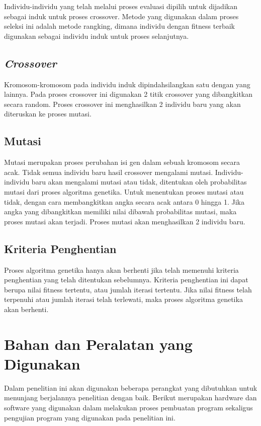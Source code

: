   Individu-individu yang telah melalui proses evaluasi dipilih untuk dijadikan sebagai induk untuk proses crossover.
  Metode yang digunakan dalam proses seleksi ini adalah metode \linebreak rangking, dimana individu dengan fitness terbaik digunakan sebagai individu induk untuk proses selanjutnya.
 
  \subsection{\emph{Crossover}}
  
  Kromosom-kromosom pada individu induk dipindahsilangkan satu dengan yang lainnya. Pada proses crossover ini digunakan 2 titik crossover yang dibangkitkan secara random.
  Proses crossover ini menghasilkan 2 individu baru yang akan diteruskan ke proses mutasi.

  \subsection{Mutasi}
  
  Mutasi merupakan proses perubahan isi gen dalam sebuah kromosom secara acak. Tidak semua individu baru hasil crossover mengalami mutasi. 
  Individu-individu baru akan mengalami mutasi atau tidak, ditentukan oleh probabilitas mutasi dari proses algoritma genetika. 
  Untuk menentukan proses mutasi atau tidak, dengan cara membangkitkan angka secara acak antara 0 hingga 1. 
  Jika angka yang dibangkitkan memiliki nilai dibawah probabilitas mutasi, maka proses mutasi akan terjadi.
  Proses mutasi akan menghasilkan 2 individu baru.
  \subsection{Kriteria Penghentian}
  
  Proses algoritma genetika hanya akan berhenti jika telah memenuhi kriteria penghentian yang telah ditentukan sebelumnya. 
  Kriteria penghentian ini dapat berupa nilai fitness tertentu, atau jumlah iterasi tertentu. 
  Jika nilai fitness telah terpenuhi atau jumlah iterasi telah terlewati, maka proses algoritma genetika akan berhenti.

\section{Bahan dan Peralatan yang Digunakan}
Dalam penelitian ini akan digunakan beberapa perangkat yang dibutuhkan untuk menunjang berjalannya penelitian dengan baik.
Berikut merupakan hardware dan software yang digunakan dalam melakukan proses pembuatan program sekaligus pengujian program yang digunakan pada penelitian ini.
